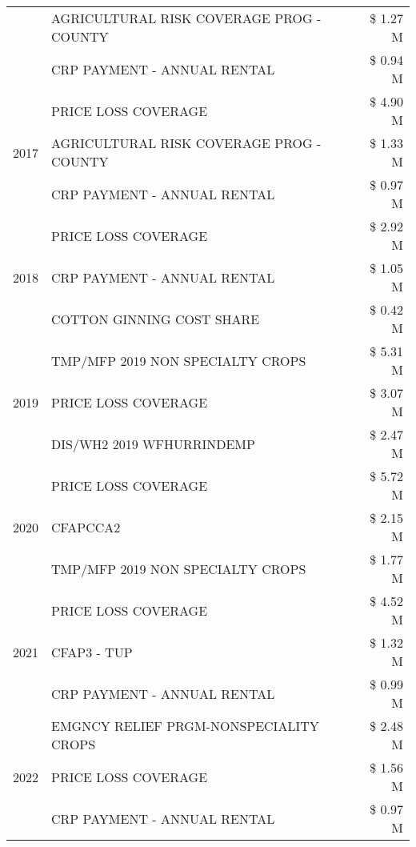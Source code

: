 \begin{tabular}{llr}
 & AGRICULTURAL RISK COVERAGE PROG - COUNTY & \$ 1.27 M \\
 & CRP PAYMENT - ANNUAL RENTAL & \$ 0.94 M \\
\cline{1-3}
\multirow[t]{3}{*}{2017} & PRICE LOSS COVERAGE & \$ 4.90 M \\
 & AGRICULTURAL RISK COVERAGE PROG - COUNTY & \$ 1.33 M \\
 & CRP PAYMENT - ANNUAL RENTAL & \$ 0.97 M \\
\cline{1-3}
\multirow[t]{3}{*}{2018} & PRICE LOSS COVERAGE & \$ 2.92 M \\
 & CRP PAYMENT - ANNUAL RENTAL & \$ 1.05 M \\
 & COTTON GINNING COST SHARE & \$ 0.42 M \\
\cline{1-3}
\multirow[t]{3}{*}{2019} & TMP/MFP 2019 NON SPECIALTY CROPS & \$ 5.31 M \\
 & PRICE LOSS COVERAGE & \$ 3.07 M \\
 & DIS/WH2 2019 WFHURRINDEMP & \$ 2.47 M \\
\cline{1-3}
\multirow[t]{3}{*}{2020} & PRICE LOSS COVERAGE & \$ 5.72 M \\
 & CFAPCCA2 & \$ 2.15 M \\
 & TMP/MFP 2019 NON SPECIALTY CROPS & \$ 1.77 M \\
\cline{1-3}
\multirow[t]{3}{*}{2021} & PRICE LOSS COVERAGE & \$ 4.52 M \\
 & CFAP3 - TUP & \$ 1.32 M \\
 & CRP PAYMENT - ANNUAL RENTAL & \$ 0.99 M \\
\cline{1-3}
\multirow[t]{3}{*}{2022} & EMGNCY RELIEF PRGM-NONSPECIALITY CROPS & \$ 2.48 M \\
 & PRICE LOSS COVERAGE & \$ 1.56 M \\
 & CRP PAYMENT - ANNUAL RENTAL & \$ 0.97 M \\
\cline{1-3}
\bottomrule
\end{tabular}
